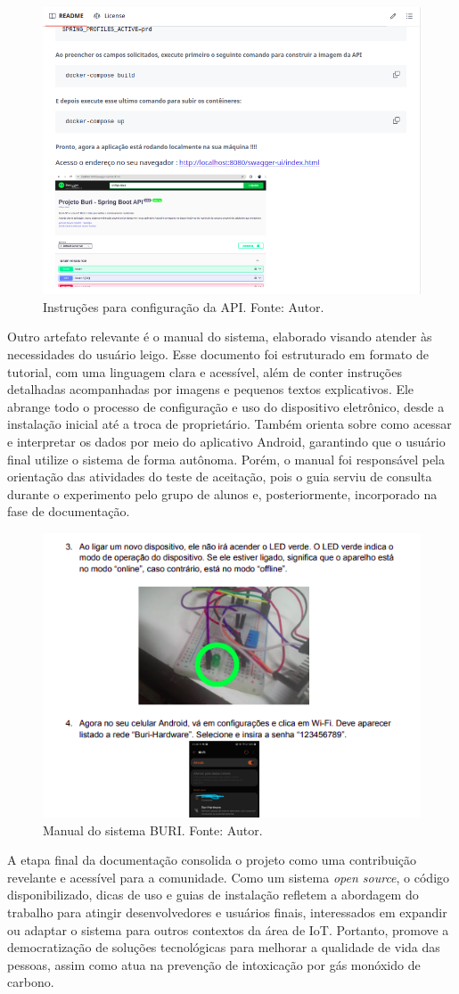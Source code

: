 \begin{figure}[ht]
    \centering
    \includegraphics[width=.60\textwidth]{img/github-tcc-readme-api.png}
    \caption{Instruções para configuração da API. Fonte: Autor.}\label{figGithubAPI}
\end{figure}

Outro artefato relevante é o manual do sistema, elaborado visando atender às necessidades do usuário leigo. Esse documento foi estruturado em formato de tutorial, com uma linguagem clara e acessível, além de 
conter instruções detalhadas acompanhadas por imagens e pequenos textos explicativos. Ele abrange todo o processo de configuração e uso do dispositivo eletrônico, desde a instalação inicial até a troca de proprietário. Também 
orienta sobre como acessar e interpretar os dados por meio do aplicativo Android, garantindo que o usuário final utilize o sistema de forma autônoma. Porém, o manual foi responsável 
pela orientação das atividades do teste de aceitação, pois o guia serviu de consulta durante o experimento pelo grupo de alunos e, posteriormente, incorporado na fase de documentação.

\begin{figure}[ht]
    \centering
    \includegraphics[width=.60\textwidth]{img/documentacao-manual.png}
    \caption{Manual do sistema BURI. Fonte: Autor.}\label{figGithubManual}
\end{figure}

A etapa final da documentação consolida o projeto como uma contribuição revelante e acessível para a comunidade. Como um sistema \textit{open source}, o código disponibilizado, dicas de uso e guias de instalação refletem a abordagem 
do trabalho para atingir desenvolvedores e usuários finais, interessados em expandir ou adaptar o sistema para outros contextos da área de IoT. Portanto, promove a democratização de soluções tecnológicas para melhorar a qualidade de 
vida das pessoas, assim como atua na prevenção de intoxicação por gás monóxido de carbono.
